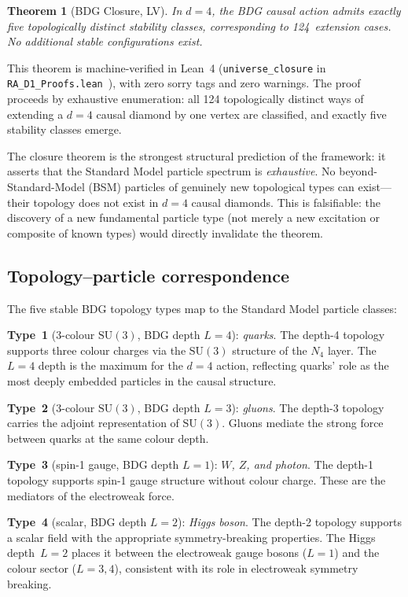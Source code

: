 \documentclass[12pt,a4paper]{article}
\newtheorem{theorem}{Theorem}[section]
\begin{document}
\begin{theorem}[BDG Closure, LV]\label{thm:closure}
In $d=4$, the BDG causal action admits exactly five topologically distinct stability classes, corresponding to 124~extension cases. No additional stable configurations exist.
\end{theorem}

This theorem is machine-verified in Lean~4 (\texttt{universe\_closure} in \texttt{RA\_D1\_Proofs.lean}~\cite{GitHub}), with zero sorry tags and zero warnings. The proof proceeds by exhaustive enumeration: all 124 topologically distinct ways of extending a $d=4$ causal diamond by one vertex are classified, and exactly five stability classes emerge.

The closure theorem is the strongest structural prediction of the framework: it asserts that the Standard Model particle spectrum is \emph{exhaustive}. No beyond-Standard-Model (BSM) particles of genuinely new topological types can exist---their topology does not exist in $d=4$ causal diamonds. This is falsifiable: the discovery of a new fundamental particle type (not merely a new excitation or composite of known types) would directly invalidate the theorem.

\subsection{Topology--particle correspondence}\label{sec:correspondence}

The five stable BDG topology types map to the Standard Model particle classes:

\textbf{Type~1} (3-colour $\mathrm{SU}(3)$, BDG depth $L=4$): \emph{quarks}. The depth-4 topology supports three colour charges via the $\mathrm{SU}(3)$ structure of the $N_4$ layer. The $L=4$ depth is the maximum for the $d=4$ action, reflecting quarks' role as the most deeply embedded particles in the causal structure.

\textbf{Type~2} (3-colour $\mathrm{SU}(3)$, BDG depth $L=3$): \emph{gluons}. The depth-3 topology carries the adjoint representation of $\mathrm{SU}(3)$. Gluons mediate the strong force between quarks at the same colour depth.

\textbf{Type~3} (spin-1 gauge, BDG depth $L=1$): \emph{$W$, $Z$, and photon}. The depth-1 topology supports spin-1 gauge structure without colour charge. These are the mediators of the electroweak force.

\textbf{Type~4} (scalar, BDG depth $L=2$): \emph{Higgs boson}. The depth-2 topology supports a scalar field with the appropriate symmetry-breaking properties. The Higgs depth~$L=2$ places it between the electroweak gauge bosons ($L=1$) and the colour sector ($L=3,4$), consistent with its role in electroweak symmetry breaking.
\end{document}
